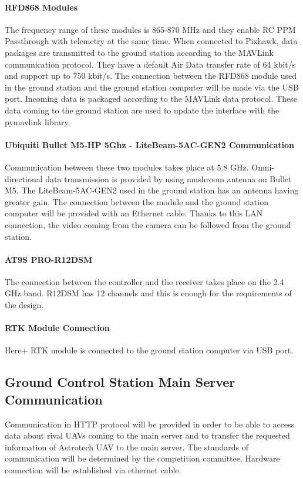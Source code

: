 \documentclass[12pt]{article}
\begin{document}
\paragraph*{RFD868 Modules} The frequency range of these modules is 865-870 MHz and they enable RC PPM Passthrough with telemetry at the same time. When connected to Pixhawk, data packages are transmitted to the ground station according to the MAVLink communication protocol. They have a default Air Data transfer rate of 64 kbit/s and support up to 750 kbit/s. The connection between the RFD868 module used in the ground station and the ground station computer will be made via the USB port. Incoming data is packaged according to the MAVLink data protocol. These data coming to the ground station are used to update the interface with the pymavlink library.

\paragraph*{Ubiquiti Bullet M5-HP 5Ghz - LiteBeam-5AC-GEN2 Communication} Communication between these two modules takes place at 5.8 GHz. Omni-directional data transmission is provided by using mushroom antenna on Bullet M5. The LiteBeam-5AC-GEN2 used in the ground station has an antenna having greater gain. The connection between the module and the ground station computer will be provided with an Ethernet cable. Thanks to this LAN connection, the video coming from the camera can be followed from the ground station.

\paragraph*{AT9S PRO-R12DSM} The connection between the controller and the receiver takes place on the 2.4 GHz band. R12DSM has 12 channels and this is enough for the requirements of the design. 

\paragraph*{RTK Module Connection} Here+ RTK module is connected to the ground station computer via USB port.

\subsection{Ground Control Station Main Server Communication}
Communication in HTTP protocol will be provided in order to be able to access data about rival UAVs coming to the main server and to transfer the requested information of Astrotech UAV to the main server. The standards of communication will be determined by the competition committee. Hardware connection will be established via ethernet cable.
\end{document}
